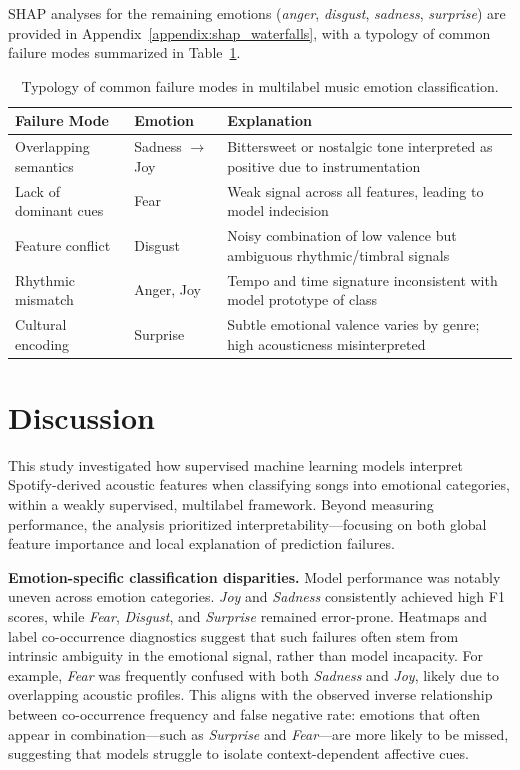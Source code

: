 \documentclass{article}
\begin{document}
SHAP analyses for the remaining emotions (\textit{anger}, \textit{disgust}, \textit{sadness}, \textit{surprise}) are provided in Appendix~\ref{appendix:shap_waterfalls}, with a typology of common failure modes summarized in Table~\ref{tab:failure_typology}.

\begin{table}[H]
\centering
\begin{tabular}{|l|l|p{8.5cm}|}
\hline
\textbf{Failure Mode} & \textbf{Emotion} & \textbf{Explanation} \\
\hline
Overlapping semantics & Sadness $\rightarrow$ Joy & Bittersweet or nostalgic tone interpreted as positive due to instrumentation \\
Lack of dominant cues & Fear & Weak signal across all features, leading to model indecision \\
Feature conflict & Disgust & Noisy combination of low valence but ambiguous rhythmic/timbral signals \\
Rhythmic mismatch & Anger, Joy & Tempo and time signature inconsistent with model prototype of class \\
Cultural encoding & Surprise & Subtle emotional valence varies by genre; high acousticness misinterpreted \\
\hline
\end{tabular}
\caption{Typology of common failure modes in multilabel music emotion classification.}
\label{tab:failure_typology}
\end{table}


\section{Discussion}

This study investigated how supervised machine learning models interpret Spotify-derived acoustic features when classifying songs into emotional categories, within a weakly supervised, multilabel framework. Beyond measuring performance, the analysis prioritized interpretability—focusing on both global feature importance and local explanation of prediction failures.

\textbf{Emotion-specific classification disparities.} Model performance was notably uneven across emotion categories. \textit{Joy} and \textit{Sadness} consistently achieved high F1 scores, while \textit{Fear}, \textit{Disgust}, and \textit{Surprise} remained error-prone. Heatmaps and label co-occurrence diagnostics suggest that such failures often stem from intrinsic ambiguity in the emotional signal, rather than model incapacity. For example, \textit{Fear} was frequently confused with both \textit{Sadness} and \textit{Joy}, likely due to overlapping acoustic profiles. This aligns with the observed inverse relationship between co-occurrence frequency and false negative rate: emotions that often appear in combination—such as \textit{Surprise} and \textit{Fear}—are more likely to be missed, suggesting that models struggle to isolate context-dependent affective cues.
\end{document}
